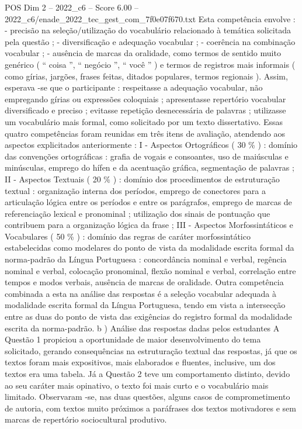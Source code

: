 \begin{textsample}{POS Dim 2 – 2022\_c6 – Score 6.00 – 2022\_c6/enade\_2022\_tec\_gest\_com\_7f0e07f670.txt}
Esta competência envolve : - precisão na seleção/utilização do vocabulário relacionado à temática solicitada pela questão ; - diversificação e adequação vocabular ; - coerência na combinação vocabular ; - ausência de marcas da oralidade, como termos de sentido muito genérico ( “ coisa ”, “ negócio ”, “ você ” ) e termos de registros mais informais ( como gírias, jargões, frases feitas, ditados populares, termos regionais ).
Assim, esperava -se que o participante : respeitasse a adequação vocabular, não empregando gírias ou expressões coloquiais ; apresentasse repertório vocabular diversificado e preciso ; evitasse repetição desnecessária de palavras ; utilizasse um vocabulário mais formal, como solicitado por um texto dissertativo.
Essas quatro competências foram reunidas em três itens de avaliação, atendendo aos aspectos explicitados anteriormente : I - Aspectos Ortográficos ( 30 \% ) : domínio das convenções ortográficas : grafia de vogais e consoantes, uso de maiúsculas e minúsculas, emprego do hífen e da acentuação gráfica, segmentação de palavras ; II - Aspectos Textuais ( 20 \% ) : domínio dos procedimentos de estruturação textual : organização interna dos períodos, emprego de conectores para a articulação lógica entre os períodos e entre os parágrafos, emprego de marcas de referenciação lexical e pronominal ; utilização dos sinais de pontuação que contribuem para a organização lógica da frase ; III - Aspectos Morfossintáticos e Vocabulares ( 50 \% ) : domínio das regras de caráter morfossintático estabelecidas como modelares do ponto de vista da modalidade escrita formal da norma-padrão da Língua Portuguesa : concordância nominal e verbal, regência nominal e verbal, colocação pronominal, flexão nominal e verbal, correlação entre tempos e modos verbais, ausência de marcas de oralidade.
Outra competência combinada a esta na análise das respostas é a seleção vocabular adequada à modalidade escrita formal da Língua Portuguesa, tendo em vista a intersecção entre as duas do ponto de vista das exigências do registro formal da modalidade escrita da norma-padrão. b ) Análise das respostas dadas pelos estudantes A Questão 1 propiciou a oportunidade de maior desenvolvimento do tema solicitado, gerando consequências na estruturação textual das respostas, já que os textos foram mais expositivos, mais elaborados e fluentes, inclusive, um dos textos era uma tabela.
Já a Questão 2 teve um comportamento distinto, devido ao seu caráter mais opinativo, o texto foi mais curto e o vocabulário mais limitado.
Observaram -se, nas duas questões, alguns casos de comprometimento de autoria, com textos muito próximos a paráfrases dos textos motivadores e sem marcas de repertório sociocultural produtivo.

\end{textsample}

